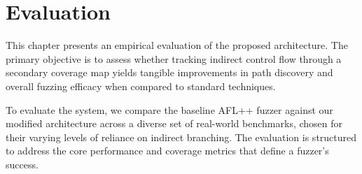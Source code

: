 \chapter{Evaluation}
\label{ch:eval}

This chapter presents an empirical evaluation of the proposed architecture. The primary objective is to assess whether tracking indirect control flow through a secondary coverage map yields tangible improvements in path discovery and overall fuzzing efficacy when compared to standard techniques.

To evaluate the system, we compare the baseline AFL++ fuzzer against our modified architecture across a diverse set of real-world benchmarks, chosen for their varying levels of reliance on indirect branching. The evaluation is structured to address the core performance and coverage metrics that define a fuzzer's success.








